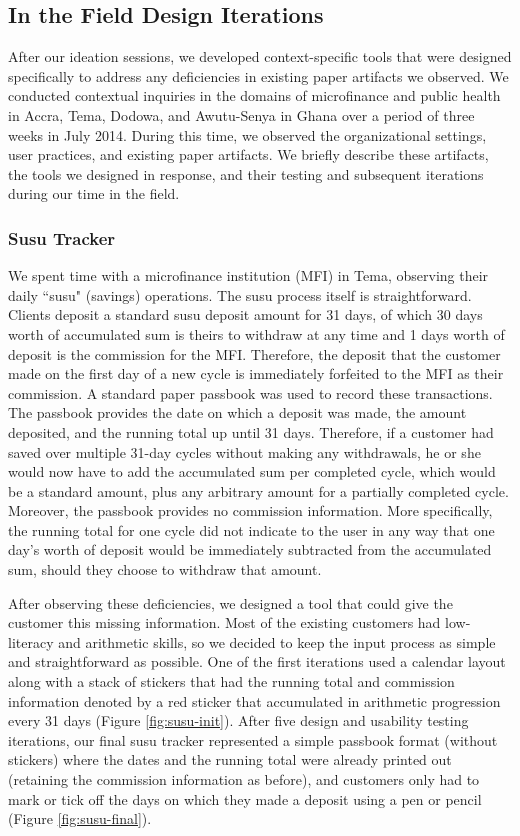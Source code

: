 \documentclass{sig-alternate}
\begin{document}
\subsection{In the Field Design Iterations}

After our ideation sessions, we developed context-specific tools that were designed specifically to address any deficiencies in existing paper artifacts we observed. We conducted contextual inquiries in the domains of microfinance and public health in Accra, Tema, Dodowa, and Awutu-Senya in Ghana over a period of three weeks in July 2014. During this time, we observed the organizational settings, user practices, and existing paper artifacts. We briefly describe these artifacts, the tools we designed in response, and their testing and subsequent iterations during our time in the field.

\subsubsection{Susu Tracker}
We spent time with a microfinance institution (MFI) in Tema, observing their daily ``susu" (savings) operations. The susu process itself is straightforward. Clients deposit a standard susu deposit amount for 31 days, of which 30 days worth of accumulated sum is theirs to withdraw at any time and 1 days worth of deposit is the commission for the MFI. Therefore, the deposit that the customer made on the first day of a new cycle is immediately forfeited to the MFI as their commission. A standard paper passbook was used to record these transactions. The passbook provides the date on which a deposit was made, the amount deposited, and the running total up until 31 days. Therefore, if a customer had saved over multiple 31-day cycles without making any withdrawals, he or she would now have to add the accumulated sum per completed cycle, which would be a standard amount, plus any arbitrary amount for a partially completed cycle. Moreover, the passbook provides no commission information. More specifically, the running total for one cycle did not indicate to the user in any way that one day's worth of deposit would be immediately subtracted from the accumulated sum, should they choose to withdraw that amount.

After observing these deficiencies, we designed a tool that could give the customer this missing information. Most of the existing customers had low-literacy and arithmetic skills, so we decided to keep the input process as simple and straightforward as possible. One of the first iterations used a calendar layout along with a stack of stickers that had the running total and commission information denoted by a red sticker that accumulated in arithmetic progression every 31 days (Figure \ref{fig:susu-init}). After five design and usability testing iterations, our final susu tracker represented a simple passbook format (without stickers) where the dates and the running total were already printed out (retaining the commission information as before), and customers only had to mark or tick off the days on which they made a deposit using a pen or pencil (Figure \ref{fig:susu-final}).
\end{document}
